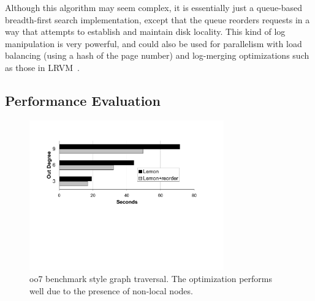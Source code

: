\documentclass[10pt,letterpaper,twocolumn,english]{article}
\newcommand{\yad}{LLADD\xspace}
\newcommand{\rcs}[1]{\textcolor{green}{\bf RCS: #1}}
\begin{document}
Although this algorithm may seem complex, it is essentially just a
queue-based breadth-first search implementation, except that the queue
reorders requests in a way that attempts to establish and maintain
disk locality.  This kind of log manipulation is very powerful, and
could also be used for parallelism with load balancing (using a hash
of the page number) and log-merging optimizations such as those in
LRVM~\cite{lrvm}.





\subsection {Performance Evaluation}

\begin{figure}[t]
\includegraphics[width=3.3in]{../paper2/oo7.pdf}
\vspace{-15pt}
\caption{\sf\label{fig:oo7} oo7 benchmark style graph traversal.  The optimization performs well due to the presence of non-local nodes.}
\end{figure}
\end{document}
